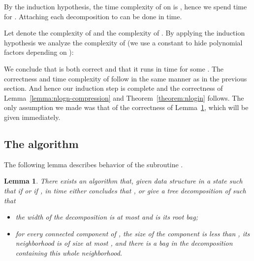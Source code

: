 \documentclass[a4paper,11pt]{article}
\newtheorem{lemma}{Lemma}[section]
\theoremstyle{definition}
\theoremstyle{remark}
\begin{document}
By the induction hypothesis, the time complexity of 
on  is , hence we spend
 time for .  Attaching
each decomposition  to  can be done in 
time.

Let  denote the complexity of  and
 the complexity of .  By applying the
induction hypothesis we analyze the complexity of 
(we use a constant  to hide polynomial factors depending on
):


We conclude that  is both correct and that it runs
in  time for some .
The correctness and time complexity  of
 follow in the same manner as in the previous section.
And hence our induction step is complete and the correctness of
Lemma~\ref{lemma:nlogn-compression} and Theorem~\ref{theorem:nlogin}
follows.  The only assumption we made was that of the correctness of
Lemma~\ref{lemma:findPTD}, which will be given immediately.


\subsection{The algorithm }

The following lemma describes behavior of the subroutine .

\begin{lemma}
  \label{lemma:findPTD}
  There exists an algorithm that, given data structure  in a
  state such that  if  or 
  if , in time  either concludes that , or give a tree decomposition  of  such that
  \begin{itemize}
  \item the width of the decomposition is at most  and  is
    its root bag;
  \item for every connected component  of , the
    size of the component is less than , its neighborhood is
    of size at most , and there is a bag in the decomposition
     containing this whole neighborhood.
  \end{itemize}
\end{lemma}
\end{document}
